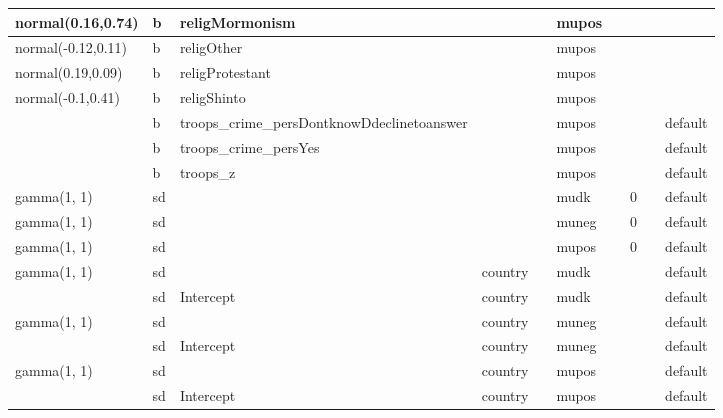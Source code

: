 \documentclass[
]{book}
\theoremstyle{definition}
\theoremstyle{definition}
\theoremstyle{definition}
\theoremstyle{definition}
\theoremstyle{remark}
\begin{document}
\begin{table}
\begin{tabular}[t]{l|l|l|l|l|l|l|l|l|l}
\hline
normal(0.16,0.74) & b & religMormonism &  &  & mupos &  &  &  & \\
\hline
normal(-0.12,0.11) & b & religOther &  &  & mupos &  &  &  & \\
\hline
normal(0.19,0.09) & b & religProtestant &  &  & mupos &  &  &  & \\
\hline
normal(-0.1,0.41) & b & religShinto &  &  & mupos &  &  &  & \\
\hline
 & b & troops\_crime\_persDontknowDdeclinetoanswer &  &  & mupos &  &  &  & default\\
\hline
 & b & troops\_crime\_persYes &  &  & mupos &  &  &  & default\\
\hline
 & b & troops\_z &  &  & mupos &  &  &  & default\\
\hline
gamma(1, 1) & sd &  &  &  & mudk &  & 0 &  & default\\
\hline
gamma(1, 1) & sd &  &  &  & muneg &  & 0 &  & default\\
\hline
gamma(1, 1) & sd &  &  &  & mupos &  & 0 &  & default\\
\hline
gamma(1, 1) & sd &  & country &  & mudk &  &  &  & default\\
\hline
 & sd & Intercept & country &  & mudk &  &  &  & default\\
\hline
gamma(1, 1) & sd &  & country &  & muneg &  &  &  & default\\
\hline
 & sd & Intercept & country &  & muneg &  &  &  & default\\
\hline
gamma(1, 1) & sd &  & country &  & mupos &  &  &  & default\\
\hline
 & sd & Intercept & country &  & mupos &  &  &  & default\\
\hline
\end{tabular}
\end{table}
\end{document}
